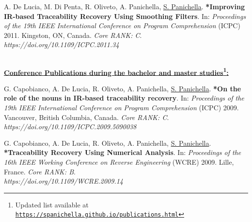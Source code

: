 \documentclass[10pt]{article}
\renewcommand{\section}[1]{\pagebreak[3]%
    \vspace{1.3\baselineskip}%
    \phantomsection\addcontentsline{toc}{section}{#1}%
    \noindent\llap{\scshape\smash{\parbox[t]{\marginparwidth}{\hyphenpenalty=10000\raggedright #1}}}%
    \vspace{-\baselineskip}\par}
\newcommand{\blankline}{\quad\pagebreak[3]}
\providecommand*\url[1]{\href{#1}{#1}}
\renewcommand*\url[1]{\href{#1}{\texttt{#1}}}
\begin{document}
\begin{bibenum}
     \item  \label{C28}  A. De Lucia, M. Di Penta, R. Oliveto, A. Panichella, \underline{S. Panichella}. \textbf{*Improving IR-based Traceability Recovery Using Smoothing Filters}. In: \emph{Proceedings of the 19th IEEE International Conference on Program Comprehension} (ICPC) 2011. Kingston, ON, Canada.  \textit{Core RANK: C}. \\\textit{https://doi.org/10.1109/ICPC.2011.34}

\end{bibenum}

\textbf{\\\underline{Conference Publications during the bachelor and master studies\footnote{Updated list available at \url{https://spanichella.github.io/publications.html}}:}}\\
\begin{bibenum}
     \item  \label{C29}  G. Capobianco, A. De Lucia, R. Oliveto, A. Panichella, \underline{S. Panichella}. \textbf{*On the role of the nouns in IR-based traceability recovery}. In: \emph{Proceedings of the 19th IEEE International Conference on Program Comprehension} (ICPC) 2009. Vancouver, British Columbia, Canada.  \textit{Core RANK: C}.
\\\textit{https://doi.org/10.1109/ICPC.2009.5090038}

     \item  \label{C30}  G. Capobianco, A. De Lucia, R. Oliveto, A. Panichella, \underline{S. Panichella}. \textbf{*Traceability Recovery Using Numerical Analysis}. In: \emph{Proceedings of the 16th IEEE Working Conference on Reverse Engineering} (WCRE) 2009. Lille, France.  \textit{Core RANK: B}.\\ \textit{https://doi.org/10.1109/WCRE.2009.14}
     
\end{bibenum}



\end{document}
